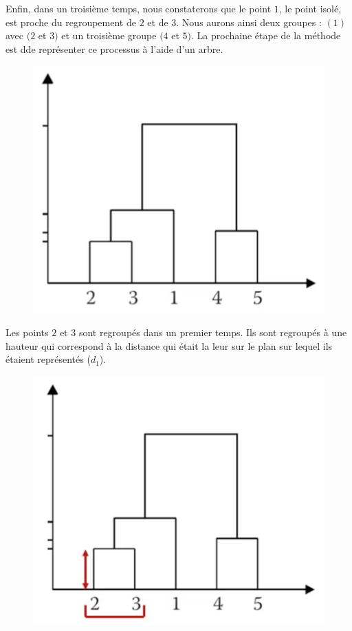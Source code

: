 Enfin, dans un troisième temps, nous constaterons que le point $1$, le point isolé, est proche du regroupement de $2$ et de $3$.\newline
Nous aurons ainsi deux groupes : $(1)$ avec $(2$ et $3)$ et un troisième groupe $(4$ et $5)$.\newline
La prochaine étape de la méthode est dde représenter ce processus à l'aide d'un arbre.
\begin{figure}[H]\begin{center}\includegraphics[scale=0.5]{ilu/ClassHierarArb.png}\end{center}\end{figure}
Les points $2$ et $3$ sont regroupés dans un premier temps. Ils sont regroupés à une hauteur qui correspond à la distance qui était la leur sur le plan sur lequel ils étaient représentés ($d_{1}$).
\begin{figure}[H]\begin{center}\includegraphics[scale=0.5]{ilu/ClassHierarArb23.png}\end{center}\end{figure}
